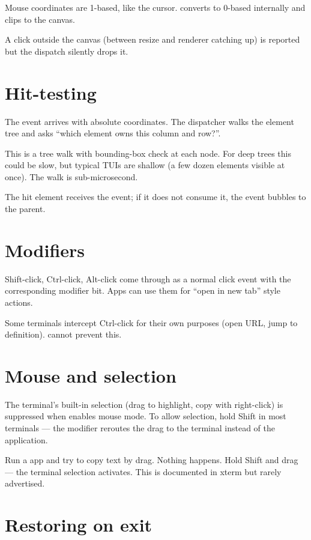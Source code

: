 Mouse coordinates are 1-based, like the cursor. \maya{}
converts to 0-based internally and clips to the canvas.

A click outside the canvas (between resize and renderer
catching up) is reported but the dispatch silently drops it.

\section{Hit-testing}

The event arrives with absolute coordinates. The dispatcher
walks the element tree and asks ``which element owns this
column and row?''.

This is a tree walk with bounding-box check at each node. For
deep trees this could be slow, but typical TUIs are shallow (a
few dozen elements visible at once). The walk is
sub-microsecond.

The hit element receives the event; if it does not consume it,
the event bubbles to the parent.

\section{Modifiers}

Shift-click, Ctrl-click, Alt-click come through as a normal
click event with the corresponding modifier bit. Apps can use
them for ``open in new tab'' style actions.

Some terminals intercept Ctrl-click for their own purposes
(open URL, jump to definition). \maya{} cannot prevent this.

\section{Mouse and selection}

The terminal's built-in selection (drag to highlight, copy
with right-click) is suppressed when \maya{} enables mouse
mode. To allow selection, hold Shift in most terminals --- the
modifier reroutes the drag to the terminal instead of the
application.

\begin{tryit}
Run a \maya{} app and try to copy text by drag. Nothing
happens. Hold Shift and drag --- the terminal selection
activates. This is documented in xterm but rarely advertised.
\end{tryit}

\section{Restoring on exit}


